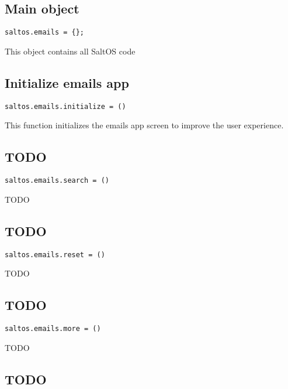 \documentclass[a4paper]{book}
\begin{document}
\subsection{Main object}

\begin{lstlisting}
saltos.emails = {};
\end{lstlisting}

This object contains all SaltOS code

\hypertarget{toc18}{}
\subsection{Initialize emails app}

\begin{lstlisting}
saltos.emails.initialize = ()
\end{lstlisting}

This function initializes the emails app screen to improve the user experience.

\hypertarget{toc19}{}
\subsection{TODO}

\begin{lstlisting}
saltos.emails.search = ()
\end{lstlisting}

TODO

\hypertarget{toc20}{}
\subsection{TODO}

\begin{lstlisting}
saltos.emails.reset = ()
\end{lstlisting}

TODO

\hypertarget{toc21}{}
\subsection{TODO}

\begin{lstlisting}
saltos.emails.more = ()
\end{lstlisting}

TODO

\hypertarget{toc22}{}
\subsection{TODO}
\end{document}
